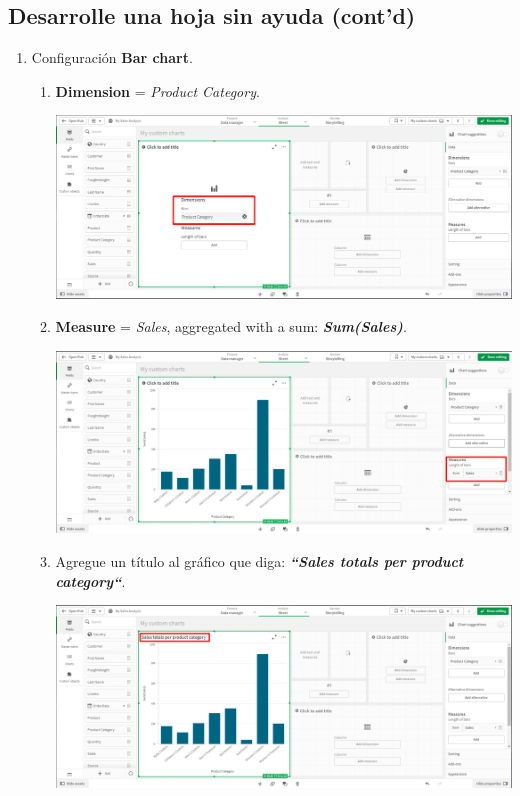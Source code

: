 \documentclass[12pt,letterpaper]{article}
\newcommand\tab[1][1cm]{\hspace*{#1}}
\begin{document}
    \subsection{Desarrolle una hoja sin ayuda (cont’d)}
    \begin{enumerate}[\tab 1.]
        \item Configuración \textbf{Bar chart}.
        \begin{enumerate}
            \item \textbf{Dimension} = \textit{Product Category}.
            \begin{center}
                \includegraphics[width=13cm]{./img/img30.1.png}
            \end{center}
            \item \textbf{Measure} = \textit{Sales}, aggregated with a sum: \textit{\textbf{Sum(Sales)}}.
            \begin{center}
                \includegraphics[width=13cm]{./img/img30.2.png}
            \end{center}
            \item Agregue un título al gráfico que diga: \textit{\textbf{“Sales totals per product category“}}.
            \begin{center}
                \includegraphics[width=13cm]{./img/img30.3.png}

\end{center}
\end{enumerate}
\end{enumerate}
\end{document}
